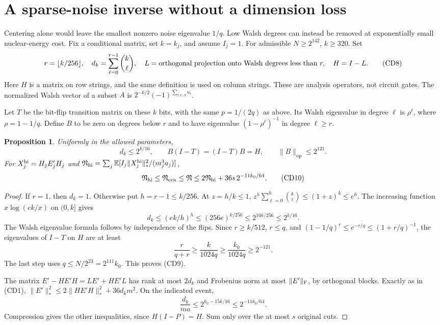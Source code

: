 \documentclass[11pt]{article}
\newtheorem{proposition}{Proposition}
\newcommand{\E}{\mathbb E}
\newcommand{\op}{\mathrm{op}}
\begin{document}
\section{A sparse-noise inverse without a dimension loss}
Centering alone would leave the smallest nonzero noise eigenvalue
$1/q$. Low Walsh degrees can instead be removed at exponentially
small nuclear-energy cost.
Fix a conditional matrix, set $k=k_j$, and assume $I_j=1$.
For admissible $N\ge2^{142}$, $k\ge320$. Set
\[
 r=\lfloor k/256\rfloor,\quad
 d_k=\sum_{\ell=0}^{r-1}\binom{k}{\ell},\quad
 L=\hbox{orthogonal projection onto Walsh degrees less than }r,
 \quad H=I-L.                                          \tag{CD8}
\]
Here $H$ is a matrix on row strings, and the same definition is
used on column strings. These are analysis operators, not circuit gates.
The normalized Walsh vector of a subset $A$ is
$2^{-k/2}(-1)^{\sum_{i\in A}u_i}$.

Let $T$ be the bit-flip transition matrix on these $k$ bits,
with the same $p=1/(2q)$ as above. Its Walsh eigenvalue in degree
$\ell$ is $\rho^\ell$, where $\rho=1-1/q$.
Define $B$ to be zero on degrees below $r$ and to have eigenvalue
$(1-\rho^\ell)^{-1}$ in degree $\ell\ge r$.

\begin{proposition}
Uniformly in the allowed parameters,
\[
 d_k\le2^{k/16},\qquad
 B(I-T)=(I-T)B=H,\qquad \|B\|_{\op}\le2^{121}.           \tag{CD9}
\]
For $X^{\rm hi}_j=H_jE'_jH_j$ and
$\mathfrak N_{\rm hi}=\sum_j\E[I_j\|X^{\rm hi}_j\|_*^2/(m_j^3a_j)]$,
\[
 \mathfrak N_{\rm hi}\le\mathfrak N_{\rm cen}\le\mathfrak N
 \le2\mathfrak N_{\rm hi}+36s\,2^{-11k_0/64}.            \tag{CD10}
\]
\end{proposition}
\begin{proof}
If $r=1$, then $d_k=1$. Otherwise put $h=r-1\le k/256$.
At $z=h/k\le1$,
$z^h\sum_{\ell=0}^h\binom{k}{\ell}\le(1+z)^k\le e^h$.
The increasing function $x\log(ek/x)$ on $(0,k]$ gives
\[
 d_k\le(ek/h)^h\le(256e)^{k/256}
       \le2^{10k/256}\le2^{k/16}.
\]
The Walsh eigenvalue formula follows by independence of the flips.
Since $r\ge k/512$, $r\le q$, and
$(1-1/q)^r\le e^{-r/q}\le(1+r/q)^{-1}$, the eigenvalues
of $I-T$ on $H$ are at least
\[
 \frac{r}{q+r}\ge\frac{k}{1024q}
 \ge\frac{k_0}{1024q}\ge2^{-121}.
\]
The last step uses $q\le N/2^{23}=2^{111}k_0$.
This proves (CD9).

The matrix $E'-HE'H=LE'+HE'L$ has rank at most $2d_k$
and Frobenius norm at most $\|E'\|_{\rm F}$, by orthogonal blocks.
Exactly as in (CD1),
$\|E'\|_*^2\le2\|HE'H\|_*^2+36d_km^2$.
On the indicated event,
\[
 \frac{d_k}{ma}\le2^{k_0-15k/16}
                         \le2^{-11k_0/64}.
\]
Compression gives the other inequalities, since $H(I-P)=H$.
Sum only over the at most $s$ original cuts.
\end{proof}
\end{document}
